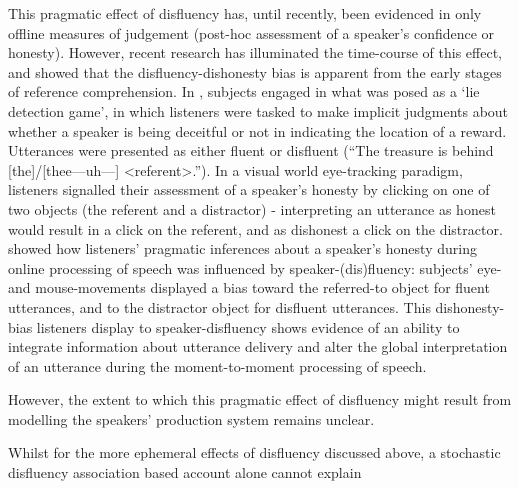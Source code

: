 \documentclass[a4paper,man,natbib]{apa6}
\begin{document}
This pragmatic effect of disfluency has, until recently, been evidenced in only offline measures of judgement (post-hoc assessment of a speaker's confidence or honesty). 
However, recent research has illuminated the time-course of this effect, and showed that the disfluency-dishonesty bias is apparent from the early stages of reference comprehension. 
In \citet{Loy2016}, subjects engaged in what was posed as a `lie detection game', in which listeners were tasked to make implicit judgments about whether a speaker is being deceitful or not in indicating the location of a reward.
Utterances were presented as either fluent or disfluent (``The treasure is behind [the]/[thee---uh---] \textless referent\textgreater .'').
In a visual world eye-tracking paradigm, listeners signalled their assessment of a speaker's honesty by clicking on one of two objects (the referent and a distractor) - interpreting an utterance as honest would result in a click on the referent, and as dishonest a click on the distractor.
\citeauthor{Loy2016} showed how listeners' pragmatic inferences about a speaker's honesty during online processing of speech was influenced by speaker-(dis)fluency: subjects' eye- and mouse-movements displayed a bias toward the referred-to object for fluent utterances, and to the distractor object for disfluent utterances. 
This dishonesty-bias listeners display to speaker-disfluency shows evidence of an ability to integrate information about utterance delivery and alter the global interpretation of an utterance during the moment-to-moment processing of speech.


However, the extent to which this pragmatic effect of disfluency might result from modelling the speakers' production system remains unclear. 

Whilst for the more ephemeral effects of disfluency discussed above, a stochastic disfluency association based account alone cannot explain 







\end{document}
